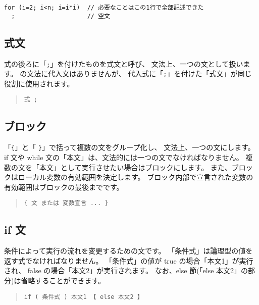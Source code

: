 \begin{mylist}
\begin{verbatim}
for (i=2; i<n; i=i*i)  // 必要なことはこの1行で全部記述できた
  ;                    // 空文
\end{verbatim}
\end{mylist}

\subsection{式文}

式の後ろに「\verb/;/」を付けたものを式文と呼び、
文法上、一つの文として扱います。
\cmml の文法に代入文はありませんが、
代入式に「\verb/;/」を付けた「式文」が同じ役割に使用されます。

\begin{quote}
\begin{verbatim}
式 ;
\end{verbatim}
\end{quote}

\subsection{ブロック}

「\verb/{/」と「 \verb/}/」で括って複数の文をグループ化し、
文法上、一つの文にします。
if 文や while 文の「本文」は、文法的には一つの文でなければなりません。
複数の文を「本文」として実行させたい場合はブロックにします。
また、ブロックはローカル変数の有効範囲を決定します。
ブロック内部で宣言された変数の有効範囲はブロックの最後までです。

\begin{quote}
\begin{verbatim}
{ 文 または 変数宣言 ... }
\end{verbatim}
\end{quote}

\subsection{if 文}

条件によって実行の流れを変更するための文です。
「条件式」は論理型の値を返す式でなければなりません。
「条件式」の値が true の場合「本文1」が実行され、
false の場合「本文2」が実行されます。
なお、else 節(「else 本文2」の部分)は省略することができます。

\begin{quote}
\begin{verbatim}
if ( 条件式 ) 本文1 【 else 本文2 】 
\end{verbatim}
\end{quote}

